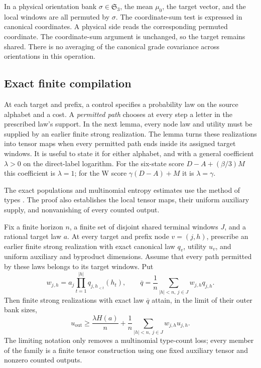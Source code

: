 In a physical orientation bank \(\sigma\in\mathfrak S_3\), the mean
\(\mu_0\), the target vector, and the local windows are all permuted
by \(\sigma\).  The coordinate-sum test is expressed in canonical
coordinates.  A physical side reads the corresponding
permuted coordinate.  The coordinate-sum argument is unchanged, so
the target remains shared.  There is no averaging of the canonical
grade covariance across orientations in this operation.

\subsection{Exact finite compilation}

At each target and prefix, a control specifies a probability law on the
source alphabet and a cost.  A
\emph{permitted path} chooses at every step a letter in the prescribed
law's support.  In the next lemma, every node law and utility must be
supplied by an earlier finite strong realization.  The lemma turns these
realizations into tensor maps when every permitted path ends inside its
assigned target windows.
It is useful to state it for either alphabet, and with a general coefficient
\(\lambda>0\) on the direct-label logarithm.  For the six-state score
\(D-A+(\beta/3)M\) this coefficient is \(\lambda=1\); for the
W score \(\gamma(D-A)+M\) it is \(\lambda=\gamma\).

The exact populations and multinomial entropy estimates use the method
of types \cite[Section~II]{csiszar1998}.  The proof also establishes
the local tensor maps, their uniform auxiliary supply, and nonvanishing
of every counted output.

\begin{lemma}\label{lem:compile}
Fix a finite horizon \(n\), a finite set of disjoint shared terminal
windows \(J\), and a rational target law \(a\).  At every target and
prefix node \(v=(j,h)\), prescribe an earlier finite strong realization
with exact canonical law \(q_v\), utility \(u_v\), and uniform auxiliary
and byproduct dimensions.  Assume that every path permitted by these
laws belongs to its target windows.  Put
\[
 w_{j,h}=a_j\prod_{t=1}^{|h|}q_{j,h_{<t}}(h_t),
 \qquad
 \overline q=\frac1n\sum_{|h|<n,\ j\in J}w_{j,h}q_{j,h}.
\]
Then finite strong realizations with exact law \(\overline q\) attain,
in the limit of their outer bank sizes,
\begin{equation}\label{ap:compile-score}
 u_{\mathrm{out}}
 \geq\frac{\lambda H(a)}n
      +\frac1n\sum_{|h|<n,\ j\in J}w_{j,h}u_{j,h}.
\end{equation}
The limiting notation only removes a multinomial type-count loss;
every member of the family is a finite tensor construction using one
fixed auxiliary tensor and nonzero counted outputs.
\end{lemma}

